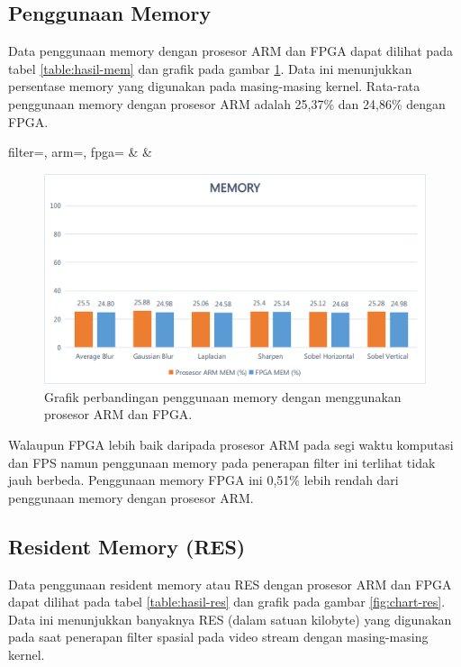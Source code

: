 \subsection{Penggunaan Memory}
Data penggunaan memory dengan prosesor ARM dan FPGA dapat dilihat pada tabel \ref{table:hasil-mem} dan grafik pada gambar \ref{fig:chart-mem}. Data ini menunjukkan persentase memory yang digunakan pada masing-masing kernel. Rata-rata penggunaan memory dengan prosesor ARM adalah 25,37\% dan 24,86\% dengan FPGA. 
\begin{atable}
    \caption{Tabel perbandingan penggunaan memory dengan menggunakan prosesor ARM dan FPGA.}
    \label{table:hasil-mem}
        {
            filter=\filter, 
            arm=\arm, 
            fpga=\fpga}
        {
            \filter & 
            \arm & 
            \fpga }
\end{atable}
\begin{figure}[H]
    \includegraphics[width=0.81\linewidth, center]{images/chart/chart-mem.png}
    \caption{Grafik perbandingan penggunaan memory dengan menggunakan prosesor ARM dan FPGA.}
    \label{fig:chart-mem}
\end{figure}
Walaupun FPGA lebih baik daripada prosesor ARM pada segi waktu komputasi dan FPS namun penggunaan memory pada penerapan filter ini terlihat tidak jauh berbeda. Penggunaan memory FPGA ini 0,51\% lebih rendah dari penggunaan memory dengan prosesor ARM.


\subsection{Resident Memory (RES)}
Data penggunaan resident memory atau RES dengan prosesor ARM dan FPGA dapat dilihat pada tabel \ref{table:hasil-res} dan grafik pada gambar \ref{fig:chart-res}. Data ini menunjukkan banyaknya RES (dalam satuan kilobyte) yang digunakan pada saat penerapan filter spasial pada video stream dengan masing-masing kernel.

